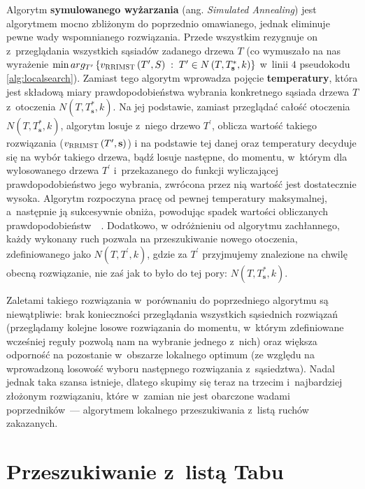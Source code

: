 Algorytm \textbf{symulowanego wyżarzania} (ang. \textit{Simulated Annealing}) jest algorytmem mocno zbliżonym do poprzednio omawianego, jednak eliminuje pewne wady wspomnianego rozwiązania.
Przede wszystkim rezygnuje on z~przeglądania wszystkich sąsiadów zadanego drzewa $T$ (co wymuszało na nas wyrażenie $\min arg_{T^{\prime}} \left\{ v_{\textsc{RRIMST}} \left( T^{\prime}, S \right) \; : \; T^{\prime} \in N \left( T, T^{\ast}_{\textbf{s}}, k \right) \right\}$ w~linii $4$ pseudokodu \ref{alg:localsearch}).
Zamiast tego algorytm wprowadza pojęcie \textbf{temperatury}, która jest składową miary prawdopodobieństwa wybrania konkretnego sąsiada drzewa $T$ z~otoczenia $N \left( T, T^{\ast}_{\textbf{s}}, k \right)$.
Na jej podstawie, zamiast przeglądać całość otoczenia $N \left( T, T^{\ast}_{\textbf{s}}, k \right)$, algorytm losuje z~niego drzewo $T^{\prime}$, oblicza wartość takiego rozwiązania ($v_{\textsc{RRIMST}} \left( T^{\prime}, \textbf{s} \right)$) i na podstawie tej danej oraz temperatury decyduje się na wybór takiego drzewa, bądź losuje następne, do momentu, w~którym dla wylosowanego drzewa $T^{\prime}$ i~przekazanego do funkcji wyliczającej prawdopodobieństwo jego wybrania, zwrócona przez nią wartość jest dostatecznie wysoka.
Algorytm rozpoczyna pracę od pewnej temperatury maksymalnej, a~następnie ją sukcesywnie obniża, powodując spadek wartości obliczanych prawdopodobieństw~\cite{Nikulin2008}~\cite{Jany2015}.
Dodatkowo, w odróżnieniu od algorytmu zachłannego, każdy wykonany ruch pozwala na przeszukiwanie nowego otoczenia, zdefiniowanego jako $N \left( T, T^{\prime}, k \right)$, gdzie za $T^{\prime}$ przyjmujemy znalezione na chwilę obecną rozwiązanie, nie zaś jak to było do tej pory: $N \left( T, T^{\ast}_{\textbf{s}}, k \right)$.

Zaletami takiego rozwiązania w~porównaniu do poprzedniego algorytmu są niewątpliwie: brak konieczności przeglądania wszystkich sąsiednich rozwiązań (przeglądamy kolejne losowe rozwiązania do momentu, w~którym zdefiniowane wcześniej reguły pozwolą nam na wybranie jednego z~nich) oraz większa odporność na pozostanie w~obszarze lokalnego optimum (ze względu na wprowadzoną losowość wyboru następnego rozwiązania z~sąsiedztwa).
Nadal jednak taka szansa istnieje, dlatego skupimy się teraz na trzecim i~najbardziej złożonym rozwiązaniu, które w~zamian nie jest obarczone wadami poprzedników~--- algorytmem lokalnego przeszukiwania z~listą ruchów zakazanych.




\section{Przeszukiwanie z~listą Tabu}




